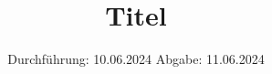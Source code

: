 

\subject{Versuch V47}
\title{Titel}
\date{%
  Durchführung: 10.06.2024
  \hspace{3em}
  Abgabe: 11.06.2024
}



\maketitle
\thispagestyle{empty}
\tableofcontents
\newpage






\printbibliography



